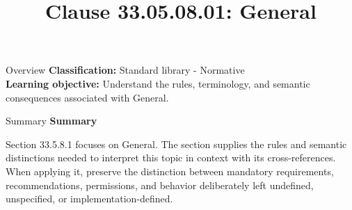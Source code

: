 \documentclass[10pt,letterpaper]{article}
\title{Clause 33.05.08.01: General}
\author{}
\date{}
\begin{document}
\maketitle
\begin{CornellOverviewBox}{Overview}
\textbf{Classification:} Standard library - Normative\\[2pt]
\textbf{Learning objective:} Understand the rules, terminology, and semantic consequences associated with General.
\end{CornellOverviewBox}\begin{CornellSummaryBox}{Summary}
{\sffamily\bfseries\color{Accent} Summary}\par\vspace{3pt}Section 33.5.8.1 focuses on General. The section supplies the rules and semantic distinctions needed to interpret this topic in context with its cross-references. When applying it, preserve the distinction between mandatory requirements, recommendations, permissions, and behavior deliberately left undefined, unspecified, or implementation-defined.
\end{CornellSummaryBox}
\end{document}
